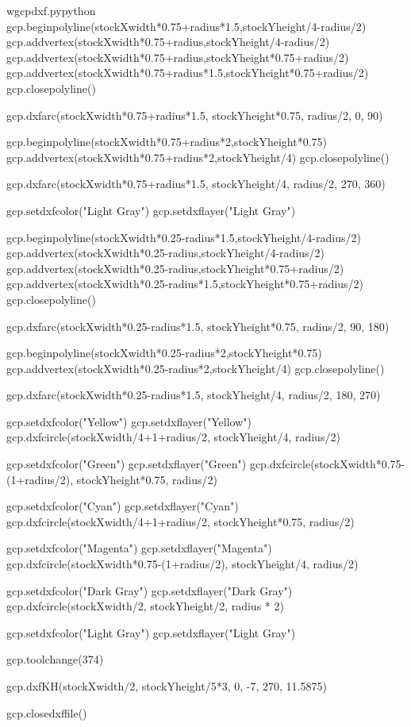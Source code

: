 \documentclass{ltxdoc}
\begin{document}
\begin{writecode}{w}{gcpdxf.py}{python}
gcp.beginpolyline(stockXwidth*0.75+radius*1.5,stockYheight/4-radius/2)
gcp.addvertex(stockXwidth*0.75+radius,stockYheight/4-radius/2)
gcp.addvertex(stockXwidth*0.75+radius,stockYheight*0.75+radius/2)
gcp.addvertex(stockXwidth*0.75+radius*1.5,stockYheight*0.75+radius/2)
gcp.closepolyline()

gcp.dxfarc(stockXwidth*0.75+radius*1.5, stockYheight*0.75, radius/2,  0, 90)

gcp.beginpolyline(stockXwidth*0.75+radius*2,stockYheight*0.75)
gcp.addvertex(stockXwidth*0.75+radius*2,stockYheight/4)
gcp.closepolyline()

gcp.dxfarc(stockXwidth*0.75+radius*1.5, stockYheight/4, radius/2,  270, 360)

gcp.setdxfcolor("Light Gray")
gcp.setdxflayer("Light Gray")

gcp.beginpolyline(stockXwidth*0.25-radius*1.5,stockYheight/4-radius/2)
gcp.addvertex(stockXwidth*0.25-radius,stockYheight/4-radius/2)
gcp.addvertex(stockXwidth*0.25-radius,stockYheight*0.75+radius/2)
gcp.addvertex(stockXwidth*0.25-radius*1.5,stockYheight*0.75+radius/2)
gcp.closepolyline()

gcp.dxfarc(stockXwidth*0.25-radius*1.5, stockYheight*0.75, radius/2,  90, 180)

gcp.beginpolyline(stockXwidth*0.25-radius*2,stockYheight*0.75)
gcp.addvertex(stockXwidth*0.25-radius*2,stockYheight/4)
gcp.closepolyline()

gcp.dxfarc(stockXwidth*0.25-radius*1.5, stockYheight/4, radius/2,  180, 270)

gcp.setdxfcolor("Yellow")
gcp.setdxflayer("Yellow")
gcp.dxfcircle(stockXwidth/4+1+radius/2, stockYheight/4, radius/2)

gcp.setdxfcolor("Green")
gcp.setdxflayer("Green")
gcp.dxfcircle(stockXwidth*0.75-(1+radius/2), stockYheight*0.75, radius/2)

gcp.setdxfcolor("Cyan")
gcp.setdxflayer("Cyan")
gcp.dxfcircle(stockXwidth/4+1+radius/2, stockYheight*0.75, radius/2)

gcp.setdxfcolor("Magenta")
gcp.setdxflayer("Magenta")
gcp.dxfcircle(stockXwidth*0.75-(1+radius/2), stockYheight/4, radius/2)

gcp.setdxfcolor("Dark Gray")
gcp.setdxflayer("Dark Gray")
gcp.dxfcircle(stockXwidth/2, stockYheight/2, radius * 2)

gcp.setdxfcolor("Light Gray")
gcp.setdxflayer("Light Gray")

gcp.toolchange(374)

gcp.dxfKH(stockXwidth/2, stockYheight/5*3, 0, -7, 270, 11.5875)

gcp.closedxffile()

\end{writecode}
\addtocounter{gcpdxfpy}{132}
\end{document}
